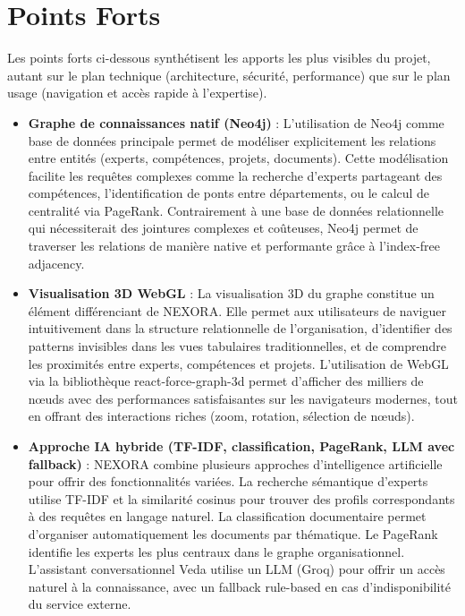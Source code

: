 \documentclass[12pt,a4paper]{report}
\begin{document}
\section{Points Forts}
Les points forts ci-dessous synthétisent les apports les plus visibles du projet, autant sur le plan technique (architecture, sécurité, performance) que sur le plan usage (navigation et accès rapide à l'expertise).
\begin{itemize}
  \item \textbf{Graphe de connaissances natif (Neo4j)} : L'utilisation de Neo4j comme base de données principale permet de modéliser explicitement les relations entre entités (experts, compétences, projets, documents). Cette modélisation facilite les requêtes complexes comme la recherche d'experts partageant des compétences, l'identification de ponts entre départements, ou le calcul de centralité via PageRank. Contrairement à une base de données relationnelle qui nécessiterait des jointures complexes et coûteuses, Neo4j permet de traverser les relations de manière native et performante grâce à l'index-free adjacency.

  \item \textbf{Visualisation 3D WebGL} : La visualisation 3D du graphe constitue un élément différenciant de NEXORA. Elle permet aux utilisateurs de naviguer intuitivement dans la structure relationnelle de l'organisation, d'identifier des patterns invisibles dans les vues tabulaires traditionnelles, et de comprendre les proximités entre experts, compétences et projets. L'utilisation de WebGL via la bibliothèque react-force-graph-3d permet d'afficher des milliers de nœuds avec des performances satisfaisantes sur les navigateurs modernes, tout en offrant des interactions riches (zoom, rotation, sélection de nœuds).

  \item \textbf{Approche IA hybride (TF-IDF, classification, PageRank, LLM avec fallback)} : NEXORA combine plusieurs approches d'intelligence artificielle pour offrir des fonctionnalités variées. La recherche sémantique d'experts utilise TF-IDF et la similarité cosinus pour trouver des profils correspondants à des requêtes en langage naturel. La classification documentaire permet d'organiser automatiquement les documents par thématique. Le PageRank identifie les experts les plus centraux dans le graphe organisationnel. L'assistant conversationnel Veda utilise un LLM (Groq) pour offrir un accès naturel à la connaissance, avec un fallback rule-based en cas d'indisponibilité du service externe.


\end{itemize}
\end{document}
